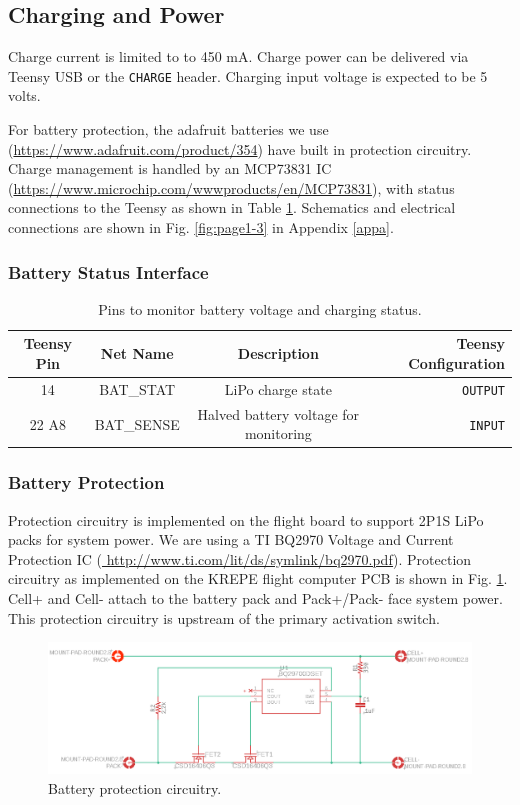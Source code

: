 \documentclass{article}
\begin{document}
\subsection{Charging and Power}

Charge current is limited to to 450 mA. Charge power can be delivered via Teensy USB or the \texttt{CHARGE} header. Charging input voltage is expected to be 5 volts.

For battery protection, the adafruit batteries we use (\url{https://www.adafruit.com/product/354}) have built in protection circuitry. Charge management is handled by an MCP73831 IC (\url{https://www.microchip.com/wwwproducts/en/MCP73831}), with status connections to the Teensy as shown in Table \ref{tab:pins-battery}. Schematics and electrical connections are shown in Fig. \ref{fig:page1-3} in Appendix \ref{appa}.

\subsubsection{Battery Status Interface}
\begin{table}[H]
    \centering
    \begin{tabular}{c|c|c|r}
    Teensy Pin & Net Name  & Description   & Teensy Configuration \\
    \hline 
    14 & BAT\_STAT & LiPo charge state & \texttt{OUTPUT} \\
    22 A8 & BAT\_SENSE    &  Halved battery voltage for monitoring &   \texttt{INPUT} 
    \end{tabular}
    \caption{Pins to monitor battery voltage and charging status.}
    \label{tab:pins-battery}
\end{table}

\subsubsection{Battery Protection}
Protection circuitry is implemented on the flight board to support 2P1S LiPo packs for system power. We are using a TI BQ2970 Voltage and Current Protection IC (\url{ http://www.ti.com/lit/ds/symlink/bq2970.pdf}). Protection circuitry as implemented on the KREPE flight computer PCB is shown in Fig. \ref{fig:bat-protec}.  Cell+ and Cell- attach to the battery pack and Pack+/Pack- face system power. This protection circuitry is upstream of the primary activation switch.

\begin{figure}[H]
    \centering
    \includegraphics[width=\textwidth]{images/battery_protection_schematic.png}
    \caption{Battery protection circuitry.}
    \label{fig:bat-protec}
\end{figure}
\end{document}

